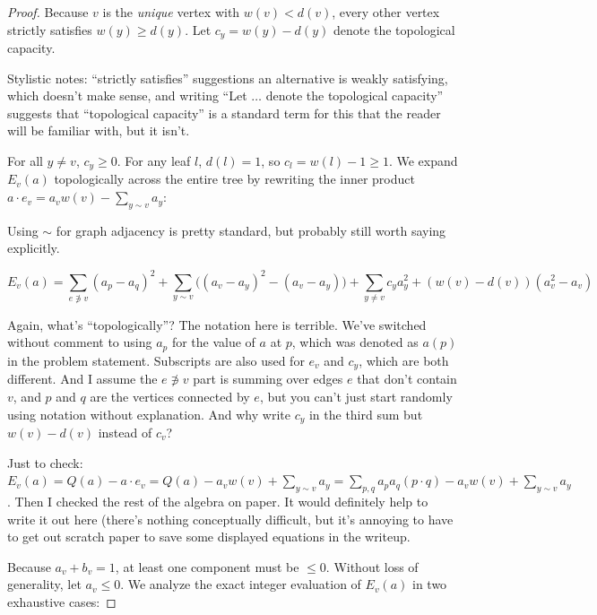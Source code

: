 \documentclass[12pt]{article}
\newcommand{\review}[1]{\begin{reviewbox}#1\end{reviewbox}}
\begin{document}
\begin{proof}
Because $v$ is the \emph{unique} vertex with $w(v) < d(v)$, every other vertex strictly satisfies $w(y) \ge d(y)$. Let $c_y = w(y) - d(y)$ denote the topological capacity. 
\review{Stylistic notes: ``strictly satisfies'' suggestions an alternative is weakly satisfying, which doesn't make sense, and writing ``Let $\dots$ denote the topological capacity'' suggests that ``topological capacity'' is a standard term for this that the reader will be familiar with, but it isn't.}
For all $y \ne v$, $c_y \ge 0$. For any leaf $l$, $d(l) = 1$, so $c_l = w(l) - 1 \ge 1$.
We expand $E_v(a)$ topologically across the entire tree by rewriting the inner product $a \cdot e_v = a_v w(v) - \sum_{y \sim v} a_y$:
\review{Using $\sim$ for graph adjacency is pretty standard, but probably still worth saying explicitly.}
\[
E_v(a) = \sum_{e \not\ni v} (a_p - a_q)^2 + \sum_{y \sim v} \big( (a_v - a_y)^2 - (a_v - a_y) \big) + \sum_{y \ne v} c_y a_y^2 + (w(v) - d(v))(a_v^2 - a_v)
\]
\review{Again, what's ``topologically''? The notation here is terrible. We've switched without comment to using $a_p$ for the value of $a$ at $p$, which was denoted as $a(p)$ in the problem statement. Subscripts are also used for $e_v$ and $c_y$, which are both different. And I assume the $e \not\ni v$ part is summing over edges $e$ that don't contain $v$, and $p$ and $q$ are the vertices connected by $e$, but you can't just start randomly using notation without explanation. And why write $c_y$ in the third sum but $w(v)-d(v)$ instead of $c_v$?}
\review{Just to check: $E_v(a) = Q(a) - a \cdot e_v = Q(a) - a_v w(v) + \sum_{y \sim v} a_y = \sum_{p,q} a_p a_q (p \cdot q) - a_v w(v) + \sum_{y \sim v} a_y$. Then I checked the rest of the algebra on paper. It would definitely help to write it out here (there's nothing conceptually difficult, but it's annoying to have to get out scratch paper to save some displayed equations in the writeup.}

Because $a_v + b_v = 1$, at least one component must be $\le 0$. Without loss of generality, let $a_v \le 0$.
We analyze the exact integer evaluation of $E_v(a)$ in two exhaustive cases:


\end{proof}
\end{document}
